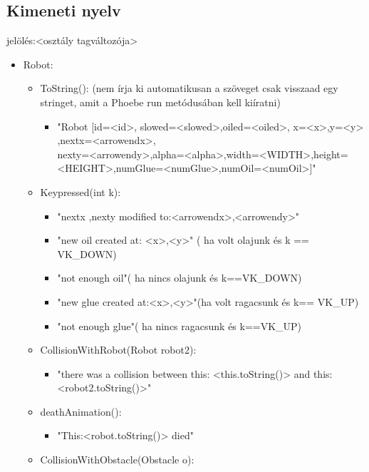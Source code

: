 \subsection{Kimeneti nyelv}

jelölés:<osztály tagváltozója>
\begin{itemize}
\item Robot: 
	\begin{itemize}
	\item ToString(): (nem írja ki automatikusan a szöveget csak visszaad egy stringet, amit a Phoebe run metódusában kell kiíratni)
	        \begin{itemize}
	\item "Robot [id=<id>,  slowed=<slowed>,oiled=<oiled>, x=<x>,y=<y> \\,nextx=<arrowendx>,\\nexty=<arrowendy>,alpha=<alpha>,width=<WIDTH>,height=<HEIGHT>,numGlue=<numGlue>,numOil=<numOil>]" 
	        \end{itemize}
	\item Keypressed(int k):
	       \begin{itemize}
	        \item "nextx ,nexty modified to:<arrowendx>,<arrowendy>"
            \item "new oil created at: <x>,<y>" ( ha volt olajunk és k == VK\_DOWN)
            \item "not enough oil"( ha nincs olajunk és k==VK\_DOWN)
            \item "new glue created at:<x>,<y>"(ha volt ragacsunk és k== VK\_UP)
            \item "not enough glue"( ha nincs ragacsunk és k==VK\_UP)
        
	       \end{itemize}
	 \item CollisionWithRobot(Robot robot2):
	       	
	        \begin{itemize}
	        \item  "there was a collision between this: <this.toString()> and this: <robot2.toString()>"
	        
	        \end{itemize}
    \item deathAnimation():
	        \begin{itemize}
	        \item  "This:<robot.toString()> died"
	        
	        \end{itemize}
	 \item CollisionWithObstacle(Obstacle o):
	       	

\end{itemize}
\end{itemize}
